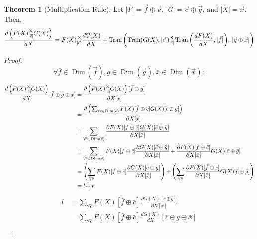 \documentclass[12pt]{article}
\theoremstyle{definition}
\newtheorem{theorem}{Theorem}[section]
\theoremstyle{case}
\theoremstyle{ppart}
\DeclareMathOperator{\Dim}{Dim}
\DeclareMathOperator{\Tran}{Tran}
\newcommand{\mmult}[1]{\text{\raisebox{1ex}{$\underset{#1}{\times}$}}}
\begin{document}
\begin{landscape}
\begin{theorem}[Multiplication Rule]
Let $|F| = \vec{f} \oplus \vec{c}$, $|G| = \vec{c} \oplus \vec{g}$,
and $|X| = \vec{x}$. Then,
\begin{align*}
 \frac{d\left(F(X) \mmult{|\vec{c}|} G(X)\right)}{dX} =
 F(X) \mmult{|\vec{c}|} \frac{dG(X)}{dX} +
 \Tran\left(
   \Tran(G(X), |\vec{c}|)
	   \mmult{|\vec{c}|}
	 \Tran\left(\frac{dF(X)}{dX}, |\vec{f}|\right),
   |\vec{g} \oplus \vec{x}|
 \right)
\end{align*}
\end{theorem}
\begin{proof}
\[
 \forall
  \bar{f} \in \Dim(\vec{f}),
	\bar{g} \in \Dim(\vec{g}),
	\bar{x} \in \Dim(\vec{x})
 :
\]
\begin{align*}
 \frac{d\left(F(X) \mmult{|\vec{c}|} G(X)\right)}{dX}
  [\bar{f} \oplus \bar{g} \oplus \bar{x}]
 &= \frac{
 			\partial \left(F(X) \mmult{|\vec{c}|} G(X)\right)[\bar{f} \oplus \bar{g}]
		}{
 			\partial X[\bar{x}]
		} \\
 &= \frac{
 			\partial \left(
				\sum_{\forall \bar{c} \in \Dim(\vec{c})}
				 F(X)[\bar{f} \oplus \bar{c}] G(X)[\bar{c} \oplus \bar{g}]
			\right)
		}{
 			\partial X[\bar{x}]
		} \\
 &= \sum_{\forall \bar{c} \in \Dim(\vec{c})}
    \frac{
			\partial F(X)[\bar{f} \oplus \bar{c}] G(X)[\bar{c} \oplus \bar{g}]
		}{
		  \partial X[\bar{x}]
	  }\\
 &= \sum_{\forall \bar{c} \in \Dim(\vec{c})}
		F(X)[\bar{f} \oplus \bar{c}]
    \frac{\partial G(X)[\bar{c} \oplus \bar{g}]}{\partial X[\bar{x}]}
		+
    \frac{\partial F(X)[\bar{f} \oplus \bar{c}]}{\partial X[\bar{x}]}
		G(X)[\bar{c} \oplus \bar{g}] \\
 &=
	 \left(
		\sum_{\forall \bar{c}}
			F(X)[\bar{f} \oplus \bar{c}]
			\frac{\partial G(X)[\bar{c} \oplus \bar{g}]}{\partial X[\bar{x}]}
	 \right)
	 +
	 \left(
		\sum_{\forall \bar{c}}
			\frac{\partial F(X)[\bar{f} \oplus \bar{c}]}{\partial X[\bar{x}]}
			G(X)[\bar{c} \oplus \bar{g}]
	 \right) \\
 &=
 	 l + r
\end{align*}
\begin{align*}
 l
 &=
	\sum_{\forall \bar{c}}
		F(X)[\bar{f} \oplus \bar{c}]
		\frac{\partial G(X)[\bar{c} \oplus \bar{g}]}{\partial X[\bar{x}]} \\
 &=
	\sum_{\forall \bar{c}}
		F(X)[\bar{f} \oplus \bar{c}]
		\frac{dG(X)}{dX}[\bar{c} \oplus \bar{g} \oplus \bar{x}] \\

\end{align*}
\end{proof}
\end{landscape}
\end{document}
